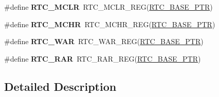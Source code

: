 \begin{DoxyCompactItemize}
\item 
\hypertarget{group___r_t_c___register___accessor___macros_ga762bb1a54d1fd63d961991ca61d4bf36}{}\#define {\bfseries R\+T\+C\+\_\+\+M\+C\+L\+R}~R\+T\+C\+\_\+\+M\+C\+L\+R\+\_\+\+R\+E\+G(\hyperlink{group___r_t_c___peripheral_ga6455e2b767b4b224b4f00b50e87a2441}{R\+T\+C\+\_\+\+B\+A\+S\+E\+\_\+\+P\+T\+R})\label{group___r_t_c___register___accessor___macros_ga762bb1a54d1fd63d961991ca61d4bf36}

\item 
\hypertarget{group___r_t_c___register___accessor___macros_gae1cf3aaa372bcdf5a0c3352aa8c73d93}{}\#define {\bfseries R\+T\+C\+\_\+\+M\+C\+H\+R}~R\+T\+C\+\_\+\+M\+C\+H\+R\+\_\+\+R\+E\+G(\hyperlink{group___r_t_c___peripheral_ga6455e2b767b4b224b4f00b50e87a2441}{R\+T\+C\+\_\+\+B\+A\+S\+E\+\_\+\+P\+T\+R})\label{group___r_t_c___register___accessor___macros_gae1cf3aaa372bcdf5a0c3352aa8c73d93}

\item 
\hypertarget{group___r_t_c___register___accessor___macros_ga9df50a03050a0b3508563c63a95abbe6}{}\#define {\bfseries R\+T\+C\+\_\+\+W\+A\+R}~R\+T\+C\+\_\+\+W\+A\+R\+\_\+\+R\+E\+G(\hyperlink{group___r_t_c___peripheral_ga6455e2b767b4b224b4f00b50e87a2441}{R\+T\+C\+\_\+\+B\+A\+S\+E\+\_\+\+P\+T\+R})\label{group___r_t_c___register___accessor___macros_ga9df50a03050a0b3508563c63a95abbe6}

\item 
\hypertarget{group___r_t_c___register___accessor___macros_ga88fb58901ea616d3040fb99e3f03722f}{}\#define {\bfseries R\+T\+C\+\_\+\+R\+A\+R}~R\+T\+C\+\_\+\+R\+A\+R\+\_\+\+R\+E\+G(\hyperlink{group___r_t_c___peripheral_ga6455e2b767b4b224b4f00b50e87a2441}{R\+T\+C\+\_\+\+B\+A\+S\+E\+\_\+\+P\+T\+R})\label{group___r_t_c___register___accessor___macros_ga88fb58901ea616d3040fb99e3f03722f}

\end{DoxyCompactItemize}


\subsection{Detailed Description}
